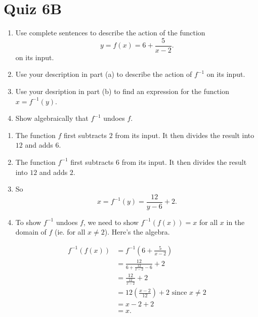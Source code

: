 \documentclass{ximera}
\begin{document}
\section{Quiz 6B}
\begin{question} \label{Qpv22dd3}
\begin{enumerate}

\item[(a)] Use complete sentences to describe the action of the function
\[
    y = f(x) = 6 + \frac{5}{x-2}.
\]
on its input.

\item[(b)] Use your description in part (a) to describe the action of $f^{-1}$ on its input.

\item[(c)] Use your desription in part (b) to find an expression for the function $x = f^{-1}(y)$.

\item[(d)] Show algebraically that $f^{-1}$ undoes $f$. 

\end{enumerate}

\begin{explanation}
\begin{enumerate}
\item The function $f$ first subtracts $2$ from its input. It then divides the result into $12$ and adds $6$.

\item The function $f^{-1}$ first subtracts $6$ from its input. It then divides the result into $12$ and adds $2$.

\item So
\[
   x = f^{-1}(y) = \frac{12}{y-6} + 2.
\]

\item To show $f^{-1}$ undoes $f$, we need to show $f^{-1}(f(x)) = x$ for all $x$ in the domain of $f$ (ie. for all $x\neq 2$). Here's the algebra.

\begin{align*}
  f^{-1}(f(x))  &= f^{-1} \left(  6 + \frac{5}{x-2} \right) \\
                     &= \frac{12}{ 6 + \frac{12}{x-2} - 6} +2 \\
                     &= \frac{12}{\frac{12}{x-2}} + 2 \\
                     &= 12\left( \frac{x-2}{12} \right) +2  \text{ since } x \neq 2\\  
                     &= x-2 + 2 \\
                    &= x.
\end{align*}


\end{enumerate}
\end{explanation}

\end{question}
\end{document}

